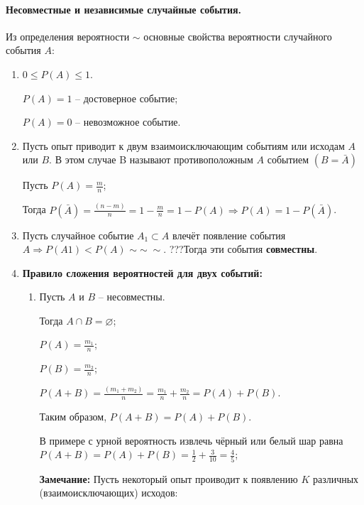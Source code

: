 \documentclass[a4paper,12pt]{report}
\newcommand*{\stitle}[1]{\rule{0pt}{15mm}\textbf{#1}}
\newcommand*{\term}[1]{\textbf{#1}}
\newcommand*{\comm}[1]{\rule{0pt}{10mm}\textbf{#1}}
\newcommand{\eset}{\varnothing}
\begin{document}
\paragraph{Несовместные и независимые случайные события.}

	Из определения вероятности $\sim$ основные свойства вероятности случайного события $A$:


	\begin{enumerate}
	
	\item	$0 \leqslant P(A) \leqslant 1$.

	$P(A) = 1$ – достоверное событие;

	$P(A) = 0$ – невозможное событие.


	\item	Пусть опыт приводит к двум взаимоисключающим событиям или исходам $A$ или $B$. В этом случае B называют противоположным $A$ событием $(B = \bar A)$

		Пусть $P(A) = \frac{m}{n}$;

		Тогда $P(\bar A) = \frac{(n-m)}{n} 
				 = 1 - \frac{m}{n} 
				 = 1 - P(A) \Rightarrow P(A) 
				 = 1 - P(\bar A)$.


	\item	Пусть случайное событие $A_1 \subset A$ влечёт появление события $A \Rightarrow P(A1) < P(A)$
	$\sim\sim\sim$.
	???Тогда эти события \term{совместны}.

	\item	\stitle{Правило сложения вероятностей для двух событий:}


		\begin{enumerate}
		
		\item	Пусть $A$ и $B$ – несовместны. 

			Тогда $A \cap B = \eset$;

			$P(A) = \frac{m_1}{n}$; 

			$P(B) = \frac{m_2}{n}$;

			$P(A+B) = \frac{(m_1+m_2)}{n} 
				= \frac{m_1}{n} + \frac{m_2}{n} 
				= P(A) + P(B)$.

			Таким образом, $P(A+B) = P(A) + P(B)$.

			В примере с урной вероятность извлечь чёрный или белый шар равна 
			$P(A+B) = P(A) + P(B) 
				= \frac{1}{2} + \frac{3}{10} 
				= \frac{4}{5}$;

			\comm{Замечание:} Пусть некоторый опыт проиводит к появлению $K$ различных (взаимоисключающих) исходов: \strut



\end{enumerate}
\end{enumerate}
\end{document}
